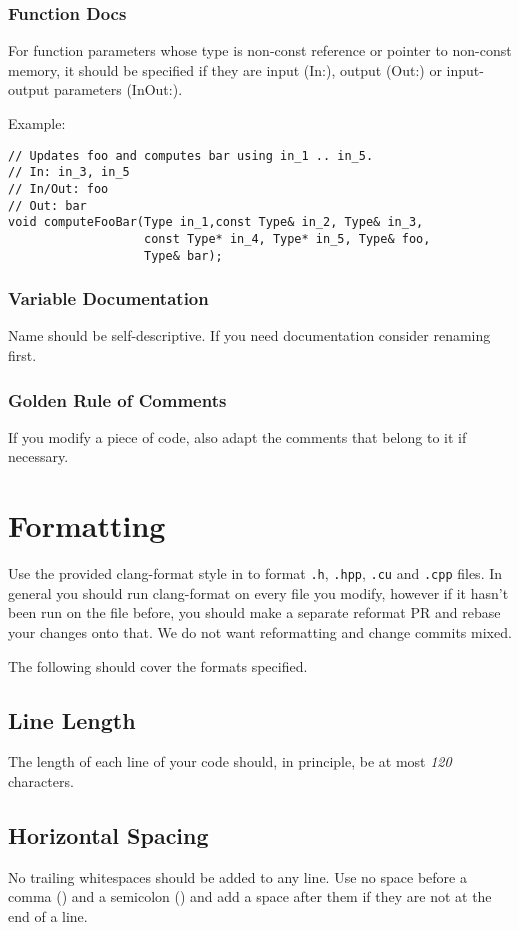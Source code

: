 \subsubsection{Function Docs}
For function parameters whose type is non-const reference or pointer to non-const memory,
it should be specified if they are input (In:), output (Out:) or input-output parameters (InOut:).

Example:
\begin{lstlisting}
// Updates foo and computes bar using in_1 .. in_5.
// In: in_3, in_5
// In/Out: foo
// Out: bar
void computeFooBar(Type in_1,const Type& in_2, Type& in_3,
                   const Type* in_4, Type* in_5, Type& foo,
                   Type& bar);
\end{lstlisting}

\subsubsection{Variable Documentation}
Name should be self-descriptive.  If you need documentation consider renaming first.

\subsubsection{Golden Rule of Comments}
If you modify a piece of code, also adapt the comments that belong to it if necessary.

\section{Formatting}
Use the provided clang-format style in  to format \verb|.h|, \verb|.hpp|, \verb|.cu| and \verb|.cpp| files. In general you should run clang-format on every file you modify, however if it hasn't been run on the file before, you should make a separate reformat PR and rebase your changes onto that.  We do not want reformatting and change commits mixed.

The following should cover the formats specified.
\subsection{Line Length}
The length of each line of your code should, in principle, be at most \emph{120} characters.

\subsection{Horizontal Spacing}
No trailing whitespaces should be added to any line.
Use no space before a comma (\inlinecode{,}) and a semicolon (\inlinecode{;}) and add a space after them if they are not at the end of a line.

